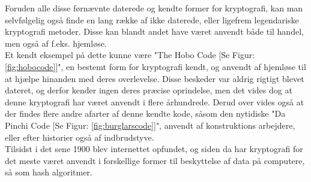 \noindent
Foruden alle disse førnævnte daterede og kendte former for kryptografi, kan man selvfølgelig også finde en lang række af ikke daterede, eller ligefrem legendariske kryptografi metoder. Disse kan blandt andet have været anvendt både til handel, men også af f.eks. hjemløse.\\
Et kendt eksempel på dette kunne være "The Hobo Code [Se Figur: \ref{fig:hobocode}]", en bestemt form for kryptografi kendt, og anvendt af hjemløse til at hjælpe hinanden med deres overlevelse\cite{TheHoboCode}. Disse beskeder var aldrig rigtigt blevet dateret, og derfor kender ingen deres præcise oprindelse, men det vides dog at denne kryptografi har været anvendt i flere århundrede. Derud over vides også at der findes flere andre afarter af denne kendte kode, såsom den nytidiske "Da Pinchi Code [Se Figur: \ref{fig:burglarscode}]", anvendt af konstruktions arbejdere, eller efter historier også af indbrudstyve.\cite{DaPinchiCode}\\
Tilsidst i det sene 1900 blev internettet opfundet, og siden da har kryptografi for det meste været anvendt i forskellige former til beskyttelse af data på computere, så som hash algoritmer.
